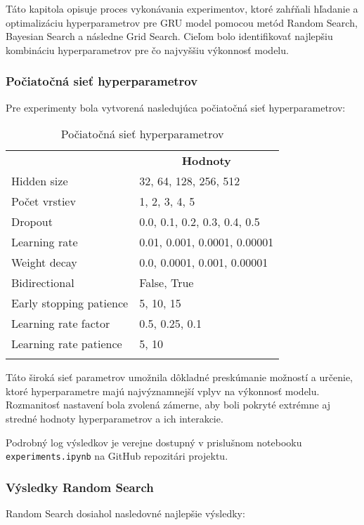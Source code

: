 Táto kapitola opisuje proces vykonávania experimentov, ktoré zahŕňali hľadanie a optimalizáciu hyperparametrov pre GRU model pomocou metód Random Search, Bayesian Search a následne Grid Search. Cieľom bolo identifikovať najlepšiu kombináciu hyperparametrov pre čo najvyššiu výkonnosť modelu.

\subsubsection{Počiatočná sieť hyperparametrov}

Pre experimenty bola vytvorená nasledujúca počiatočná sieť hyperparametrov:

\begin{table}[ht!]
\centering
\caption{Počiatočná sieť hyperparametrov}\label{t:hyperparams}
\medskip
\small
\begin{tabular}{||l||l||}
\hhline{|t:==:t|}
\multicolumn{1}{||c||}{\textbf{Hyperparameter}} & \multicolumn{1}{c||}{\textbf{Hodnoty}} \\
\hhline{|:==:|}
Hidden size & 32, 64, 128, 256, 512 \\
\hline
Počet vrstiev & 1, 2, 3, 4, 5 \\
\hline
Dropout & 0.0, 0.1, 0.2, 0.3, 0.4, 0.5 \\
\hline
Learning rate & 0.01, 0.001, 0.0001, 0.00001 \\
\hline
Weight decay & 0.0, 0.0001, 0.001, 0.00001 \\
\hline
Bidirectional & False, True \\
\hline
Early stopping patience & 5, 10, 15 \\
\hline
Learning rate factor & 0.5, 0.25, 0.1 \\
\hline
Learning rate patience & 5, 10 \\
\hhline{|b:==:b|}
\end{tabular}
\end{table}
Táto široká sieť parametrov umožnila dôkladné preskúmanie možností a určenie, ktoré hyperparametre majú najvýznamnejší vplyv na výkonnosť modelu. Rozmanitosť nastavení bola zvolená zámerne, aby boli pokryté extrémne aj stredné hodnoty hyperparametrov a ich interakcie.

Podrobný log výsledkov je verejne dostupný v prislušnom notebooku \texttt{experiments.ipynb} na GitHub \cite{GitHub} repozitári projektu.

\newpage

\subsubsection{Výsledky Random Search}
\label{sec:random_search}
Random Search dosiahol nasledovné najlepšie výsledky:


